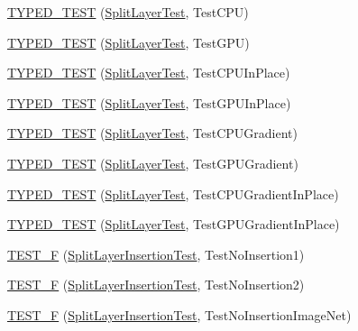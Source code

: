 \begin{DoxyCompactItemize}
\item 
\hyperlink{namespacecaffe_ace451257b69f244496de1f28bb25563e}{T\+Y\+P\+E\+D\+\_\+\+T\+E\+S\+T} (\hyperlink{classcaffe_1_1_split_layer_test}{Split\+Layer\+Test}, Test\+C\+P\+U)
\item 
\hyperlink{namespacecaffe_ae28e7a2cadc1c218d437abf801340172}{T\+Y\+P\+E\+D\+\_\+\+T\+E\+S\+T} (\hyperlink{classcaffe_1_1_split_layer_test}{Split\+Layer\+Test}, Test\+G\+P\+U)
\item 
\hyperlink{namespacecaffe_a9c63f07f10cb50a3fd0cb9d8df74c28e}{T\+Y\+P\+E\+D\+\_\+\+T\+E\+S\+T} (\hyperlink{classcaffe_1_1_split_layer_test}{Split\+Layer\+Test}, Test\+C\+P\+U\+In\+Place)
\item 
\hyperlink{namespacecaffe_a24afd896a66f72d2192ec9f5453a5b62}{T\+Y\+P\+E\+D\+\_\+\+T\+E\+S\+T} (\hyperlink{classcaffe_1_1_split_layer_test}{Split\+Layer\+Test}, Test\+G\+P\+U\+In\+Place)
\item 
\hyperlink{namespacecaffe_ab32356b369c0417857ffbff900b33961}{T\+Y\+P\+E\+D\+\_\+\+T\+E\+S\+T} (\hyperlink{classcaffe_1_1_split_layer_test}{Split\+Layer\+Test}, Test\+C\+P\+U\+Gradient)
\item 
\hyperlink{namespacecaffe_a51589763e472cc8a5cf6b2202b9cf111}{T\+Y\+P\+E\+D\+\_\+\+T\+E\+S\+T} (\hyperlink{classcaffe_1_1_split_layer_test}{Split\+Layer\+Test}, Test\+G\+P\+U\+Gradient)
\item 
\hyperlink{namespacecaffe_a2fbf424b93d7d2b2a0201a3ac0e6832a}{T\+Y\+P\+E\+D\+\_\+\+T\+E\+S\+T} (\hyperlink{classcaffe_1_1_split_layer_test}{Split\+Layer\+Test}, Test\+C\+P\+U\+Gradient\+In\+Place)
\item 
\hyperlink{namespacecaffe_a665efcc86179b1cafbc80f0f3d3ce02d}{T\+Y\+P\+E\+D\+\_\+\+T\+E\+S\+T} (\hyperlink{classcaffe_1_1_split_layer_test}{Split\+Layer\+Test}, Test\+G\+P\+U\+Gradient\+In\+Place)
\item 
\hyperlink{namespacecaffe_a3797a5352903a56a627d536c2f100f0b}{T\+E\+S\+T\+\_\+\+F} (\hyperlink{classcaffe_1_1_split_layer_insertion_test}{Split\+Layer\+Insertion\+Test}, Test\+No\+Insertion1)
\item 
\hyperlink{namespacecaffe_ad42939317f596c88a3812f4add2006bb}{T\+E\+S\+T\+\_\+\+F} (\hyperlink{classcaffe_1_1_split_layer_insertion_test}{Split\+Layer\+Insertion\+Test}, Test\+No\+Insertion2)
\item 
\hyperlink{namespacecaffe_a2be95891eab7aa572a1f194fe49ec87c}{T\+E\+S\+T\+\_\+\+F} (\hyperlink{classcaffe_1_1_split_layer_insertion_test}{Split\+Layer\+Insertion\+Test}, Test\+No\+Insertion\+Image\+Net)
\item 

\end{DoxyCompactItemize}
